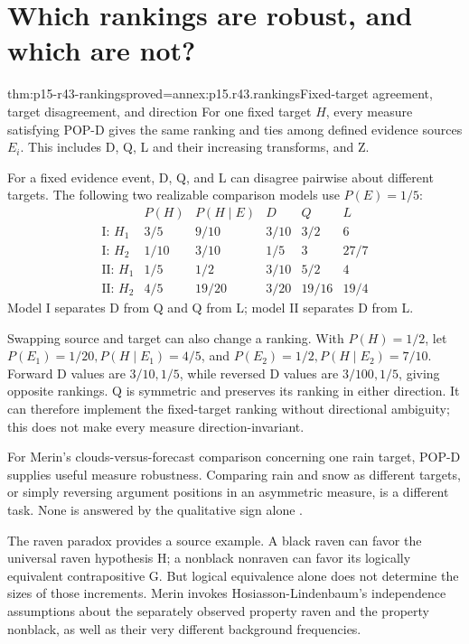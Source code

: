 \section{Which rankings are robust, and which are not?}
\label{sec:p15-r43-rankings}

\begin{hbtheorem}{thm:p15-r43-rankings}{proved=annex:p15.r43.rankings}{Fixed-target agreement, target disagreement, and direction}
For one fixed target \(H\), every measure satisfying POP-D gives
the same ranking and ties among defined evidence sources \(E_i\).
This includes D, Q, L and their increasing transforms, and Z.

For a fixed evidence event, D, Q, and L can disagree pairwise about
different targets. The following two realizable comparison models use
\(P(E)=1/5\):
\[
 \begin{array}{c|cc|ccc}
 &P(H)&P(H\mid E)&D&Q&L\\\hline
 \text{I: }H_1&3/5&9/10&3/10&3/2&6\\
 \text{I: }H_2&1/10&3/10&1/5&3&27/7\\
 \text{II: }H_1&1/5&1/2&3/10&5/2&4\\
 \text{II: }H_2&4/5&19/20&3/20&19/16&19/4
 \end{array}
\]
Model I separates D from Q and Q from L; model II separates D from L.

Swapping source and target can also change a ranking. With
\(P(H)=1/2\), let \(P(E_1)=1/20,P(H\mid E_1)=4/5\), and
\(P(E_2)=1/2,P(H\mid E_2)=7/10\). Forward D values are
\(3/10,1/5\), while reversed D values are \(3/100,1/5\), giving
opposite rankings. Q is symmetric and preserves its ranking in either
direction. It can therefore implement the fixed-target ranking without
directional ambiguity; this does not make every measure direction-invariant.
\end{hbtheorem}

For Merin's clouds-versus-forecast comparison concerning one rain target,
POP-D supplies useful measure robustness. Comparing rain and snow as
different targets, or simply reversing argument positions in an
asymmetric measure, is a different task. None is answered by the
qualitative sign alone
\parencite[pp.~268, 271--272]{Merin2021Relevance}.

The raven paradox provides a source example. A black raven can favor
the universal raven hypothesis H; a nonblack nonraven can favor its
logically equivalent contrapositive G. But logical equivalence alone
does not determine the sizes of those increments. Merin invokes
Hosiasson-Lindenbaum's independence assumptions about the separately
observed property raven and the property nonblack, as well as their
very different background frequencies.

